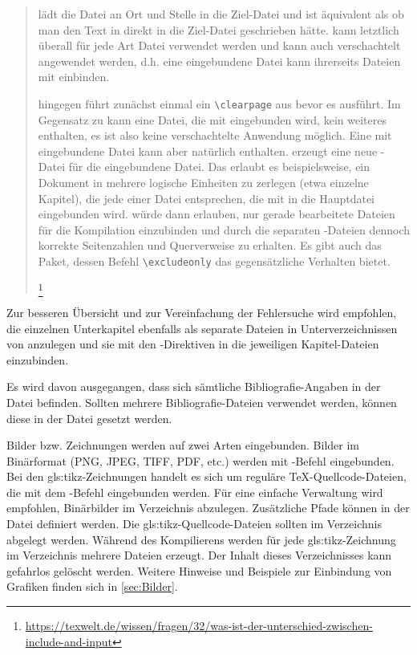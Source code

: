 \begin{quote}
{\small
\verb++ lädt die Datei an Ort und Stelle in die Ziel-Datei und ist äquivalent
als ob man den Text in  direkt in die Ziel-Datei geschrieben hätte.
\verb++ kann letztlich überall für jede Art Datei verwendet werden und kann auch verschachtelt angewendet werden,
d.h. eine eingebundene Datei kann ihrerseits Dateien mit \verb++ einbinden.

\verb++ hingegen führt zunächst einmal ein \verb+\clearpage+ aus bevor es \verb++ ausführt.
Im Gegensatz zu \verb++ kann eine Datei, die mit \verb++ eingebunden wird,
kein weiteres \verb++ enthalten, es ist also keine verschachtelte Anwendung möglich.
Eine mit \verb++ eingebundene Datei kann aber natürlich \verb++ enthalten.
\verb++ erzeugt eine neue -Datei für die eingebundene Datei.
Das erlaubt es beispielsweise, ein Dokument in mehrere logische Einheiten zu zerlegen (etwa einzelne Kapitel),
die jede einer Datei entsprechen, die mit \verb++ in die Hauptdatei eingebunden wird.
\verb++ würde dann erlauben, nur gerade bearbeitete Dateien für die Kompilation einzubinden
und durch die separaten -Dateien dennoch korrekte Seitenzahlen und Querverweise zu erhalten.
Es gibt auch das  Paket, dessen Befehl \verb+\excludeonly+ das gegensätzliche Verhalten bietet.%
}%
\footnote{\url{https://texwelt.de/wissen/fragen/32/was-ist-der-unterschied-zwischen-include-and-input}}
\end{quote}

Zur besseren Übersicht und zur Vereinfachung der Fehlersuche wird empfohlen,
die einzelnen Unterkapitel ebenfalls als separate Dateien in Unterverzeichnissen von  anzulegen
und sie mit den \verb++-Direktiven in die jeweiligen Kapitel-Dateien einzubinden.

Es wird davon ausgegangen, dass sich sämtliche Bibliografie-Angaben in der Datei
 befinden.
Sollten mehrere Bibliografie-Dateien verwendet werden, können diese in der Datei
 gesetzt werden.

Bilder bzw. Zeichnungen werden auf zwei Arten eingebunden.
Bilder im Binärformat (PNG, JPEG, TIFF, PDF, etc.)
werden mit -Befehl eingebunden. 
Bei den \gls{gls:tikz}-Zeichnungen handelt es sich um reguläre TeX-Quellcode-Dateien,
die mit dem \verb++-Befehl eingebunden werden.
Für eine einfache Verwaltung wird empfohlen, Binärbilder im Verzeichnis  abzulegen.
Zusätzliche Pfade können in der Datei  definiert werden.
Die \gls{gls:tikz}-Quellcode-Dateien sollten im Verzeichnis  abgelegt werden.
Während des Kompilierens werden für jede \gls{gls:tikz}-Zeichnung im Verzeichnis  mehrere Dateien erzeugt.
Der Inhalt dieses Verzeichnisses kann gefahrlos gelöscht werden.
Weitere Hinweise und Beispiele zur Einbindung von Grafiken finden sich in \cref{sec:Bilder}.


